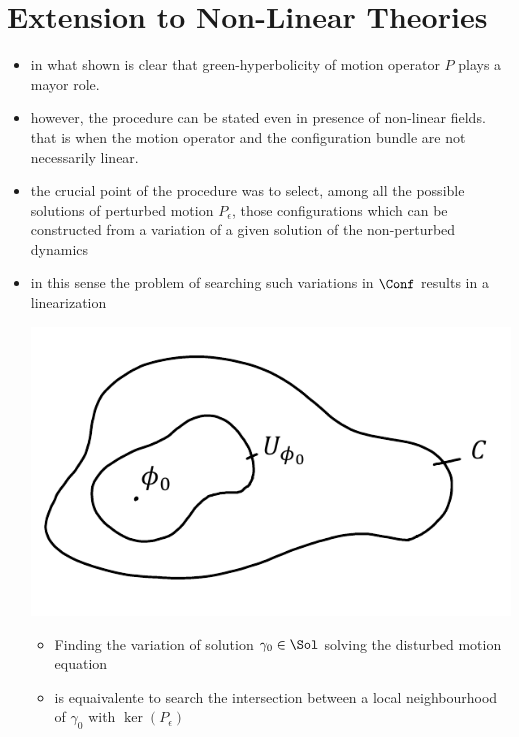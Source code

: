 \documentclass[a4paper,11pt]{scrartcl}
\begin{document}
    \section{Extension to Non-Linear Theories}
    \begin{itemize}
        \item in what shown is clear that green-hyperbolicity of motion operator $P$ plays a mayor role.
        \item however, the procedure can be stated even in presence of non-linear fields.\\
        that is when the motion operator and the configuration bundle are not necessarily linear.
        \item the crucial point of the procedure was to select, among all the possible solutions of perturbed motion $P_\epsilon$, those configurations which can be constructed from a variation of a given solution of the non-perturbed dynamics
        \item in this sense the problem of searching such variations in $\Conf$ results in a linearization\\
        \begin{minipage}{0.4\textwidth}
                   \includegraphics[width=\textwidth]{../Pictures/Linearization} 
        \end{minipage}
        \begin{minipage}{0.5\textwidth}
            \begin{itemize} 
                \item Finding the variation of solution $\gamma_0\in \Sol$ solving the disturbed motion equation
                \item is equaivalente to search the intersection between a local neighbourhood of $\gamma_0$ with $\ker(P_\epsilon)$

\end{itemize}
\end{minipage}
\end{itemize}
\end{document}
